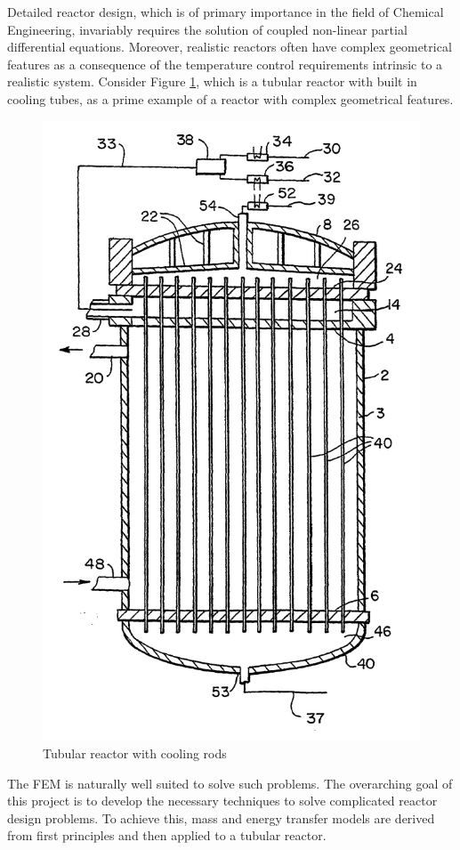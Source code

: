 \documentclass[11pt,fleqn]{article}
\theoremstyle{defstyle}
\begin{document}
Detailed reactor design, which is of primary importance in the field of Chemical Engineering, invariably requires the solution of coupled non-linear partial differential equations. Moreover, realistic reactors often have complex geometrical features as a consequence of the temperature control requirements intrinsic to a realistic system. Consider Figure \ref{fig_tub_cool}, which is a tubular reactor with built in cooling tubes, as a prime example of a reactor with complex geometrical features. 
\begin{figure}[H] 
\centering
\includegraphics[scale=0.1]{./pics/tub_cool}
\caption{Tubular reactor with cooling rods} 
\label{fig_tub_cool}
\end{figure}
The FEM is naturally well suited to solve such problems. The overarching goal of this project is to develop the necessary techniques to solve complicated reactor design problems. To achieve this, mass and energy transfer models are derived from first principles and then applied to a tubular reactor.
\end{document}
